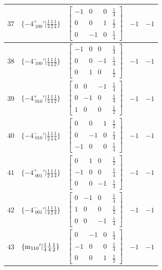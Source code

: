 \documentclass[fleqn,8pt]{jsarticle}
\begin{document}
\begin{longtable}{ccccc}
$ 37 $ & $ \{-4^{+}_{\,\,100}{}'|\frac{1}{4} \frac{1}{2} \frac{1}{4}\} $ & $ \begin{bmatrix} -1 & 0 & 0 & \frac{1}{4} \\ 0 & 0 & 1 & \frac{1}{2} \\ 0 & -1 & 0 & \frac{1}{4} \end{bmatrix} $ & $ -1 $ & $ -1 $ \\ \hline
$ 38 $ & $ \{-4^{-}_{\,\,100}{}'|\frac{1}{4} \frac{1}{4} \frac{1}{2}\} $ & $ \begin{bmatrix} -1 & 0 & 0 & \frac{1}{4} \\ 0 & 0 & -1 & \frac{1}{4} \\ 0 & 1 & 0 & \frac{1}{2} \end{bmatrix} $ & $ -1 $ & $ -1 $ \\ \hline
$ 39 $ & $ \{-4^{+}_{\,\,010}{}'|\frac{1}{4} \frac{1}{4} \frac{1}{2}\} $ & $ \begin{bmatrix} 0 & 0 & -1 & \frac{1}{4} \\ 0 & -1 & 0 & \frac{1}{4} \\ 1 & 0 & 0 & \frac{1}{2} \end{bmatrix} $ & $ -1 $ & $ -1 $ \\ \hline
$ 40 $ & $ \{-4^{-}_{\,\,010}{}'|\frac{1}{2} \frac{1}{4} \frac{1}{4}\} $ & $ \begin{bmatrix} 0 & 0 & 1 & \frac{1}{2} \\ 0 & -1 & 0 & \frac{1}{4} \\ -1 & 0 & 0 & \frac{1}{4} \end{bmatrix} $ & $ -1 $ & $ -1 $ \\ \hline
$ 41 $ & $ \{-4^{+}_{\,\,001}{}'|\frac{1}{2} \frac{1}{4} \frac{1}{4}\} $ & $ \begin{bmatrix} 0 & 1 & 0 & \frac{1}{2} \\ -1 & 0 & 0 & \frac{1}{4} \\ 0 & 0 & -1 & \frac{1}{4} \end{bmatrix} $ & $ -1 $ & $ -1 $ \\ \hline
$ 42 $ & $ \{-4^{-}_{\,\,001}{}'|\frac{1}{4} \frac{1}{2} \frac{1}{4}\} $ & $ \begin{bmatrix} 0 & -1 & 0 & \frac{1}{4} \\ 1 & 0 & 0 & \frac{1}{2} \\ 0 & 0 & -1 & \frac{1}{4} \end{bmatrix} $ & $ -1 $ & $ -1 $ \\ \hline
$ 43 $ & $ \{{\rm m}_{110}{}'|\frac{1}{4} \frac{1}{4} \frac{1}{2}\} $ & $ \begin{bmatrix} 0 & -1 & 0 & \frac{1}{4} \\ -1 & 0 & 0 & \frac{1}{4} \\ 0 & 0 & 1 & \frac{1}{2} \end{bmatrix} $ & $ -1 $ & $ -1 $ \\ \hline

\end{longtable}
\end{document}

